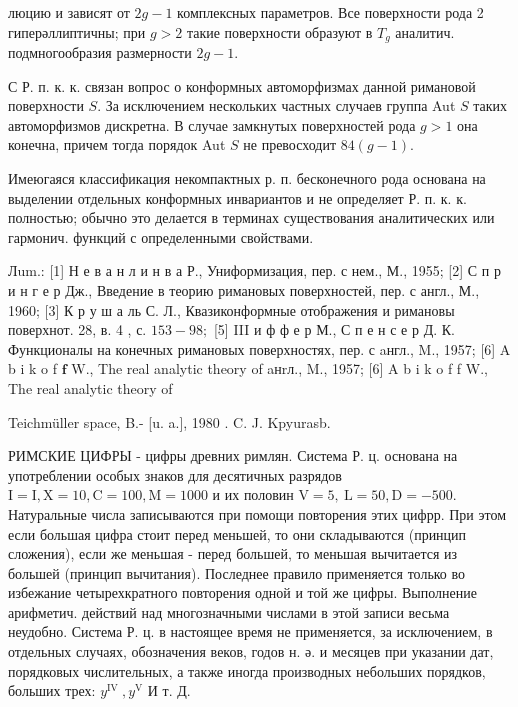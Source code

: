 \documentclass[10pt]{article}
\begin{document}
люцию и зависят от $2 g-1$ комплексных параметров. Все поверхности рода 2 гиперәллиптичны; при $g>2$ такие поверхности образуют в $T_{g}$ аналитич. подмногообразия размерности $2 g-1$.



С Р. п. к. к. связан вопрос о конформных автоморфизмах данной римановой поверхности $S$. За исключением нескольких частных случаев группа Aut $S$ таких автоморфизмов дискретна. В случае замкнутых поверхностей рода $g>1$ она конечна, причем тогда порядок Aut $S$ не превосходит $84(g-1)$.



Имеюгаяся классификация некомпактных р. п. бесконечного рода основана на выделении отдельных конформных инвариантов и не определяет Р. п. к. к. полностью; обычно это делается в терминах существования аналитических или гармонич. функций с определенными свойствами.



Лum.: [1] Н е в а н л и н в а Р., Униформизация, пер. с нем., М., 1955; [2] С п р и н г е р Дж., Введение в теорию римановых поверхностей, пер. с англ., М., 1960; [3] К р у ш а ль С. Л., Квазиконформные отображения и римановы поверхнот. 28, в. 4 , с. $153-98 ;$ [5] III и ф ф е р М., С п е н с е р Д. К. Функционалы на конечных римановых поверхностях, пер. с aнгл., M., 1957; [6] A b i k o f $\mathbf{f}$ W., The real analytic theory of aнrл., M., 1957; [6] A b i k o f f W., The real analytic theory of

Teichmüller space, B.- [u. a.], 1980 . C. J. Kpyurasb.



РИМСКИЕ ЦИФРЫ - цифры древних римлян. Система Р. ц. основана на употреблении особых знаков для десятичных разрядов $\mathrm{I}=\mathrm{I}, \mathrm{X}=10, \mathrm{C}=100, \mathrm{M}=1000$ и их половин $\mathrm{V}=5, \mathrm{~L}=50, \mathrm{D}=-500$. Натуральные числа записываются при помощи повторения этих цифрр. При этом если большая цифра стоит перед меньшей, то они складываются (принцип сложения), если же меньшая - перед большей, то меньшая вычитается из большей (принцип вычитания). Последнее правило применяется только во избежание четырехкратного повторения одной и той же цифры. Выполнение арифметич. действий над многозначными числами в этой записи весьма неудобно. Система Р. ц. в настоящее время не применяется, за исключением, в отдельных случаях, обозначения веков, годов н. ә. и месяцев при указании дат, порядковых числительных, а также иногда производных небольших порядков, больших трех: $y^{\text {IV }}, y^{\mathrm{V}}$ И т. Д.
\end{document}
